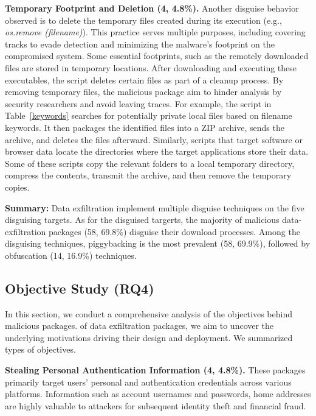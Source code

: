 \textbf{Temporary Footprint and Deletion (4, 4.8\%).} Another disguise behavior observed is to delete the temporary files created during its execution (e.g., \textit{os.remove (filename)}). This practice serves multiple purposes, including covering tracks to evade detection and minimizing the malware's footprint on the compromised system. Some essential footprints, such as the remotely downloaded files are stored in temporary locations. After downloading and executing these executables, the script deletes certain files as part of a cleanup process. By removing temporary files, the malicious package aim to hinder analysis by security researchers and avoid leaving traces. For example, the script in Table~\ref{keywords} searches for potentially private local files based on filename keywords. It then packages the identified files into a ZIP archive, sends the archive, and deletes the files afterward. Similarly, scripts that target software or browser data locate the directories where the target applications store their data. Some of these scripts copy the relevant folders to a local temporary directory, compress the contents, transmit the archive, and then remove the temporary copies.


\begin{tcolorbox}[size=title, opacityfill=0.15, after=\vspace{-10pt}]
\textbf{Summary:} Data exfiltration  implement multiple disguise techniques on the {five} disguising targets. As for the disguised targerts, the majority of malicious data-exfiltration packages (58, 69.8\%) disguise their download processes. Among the disguising techniques, piggybacking is the most prevalent (58, 69.9\%), followed by obfuscation (14, 16.9\%) techniques.
\end{tcolorbox}

\subsection{Objective Study (RQ4)}

In this section, we conduct a comprehensive analysis of the objectives behind malicious packages.  of data exfiltration packages, we aim to uncover the underlying motivations driving their design and deployment. We summarized  types of objectives.

\textbf{Stealing Personal Authentication Information (4, 4.8\%).} These packages primarily target users' personal and authentication credentials across various platforms.  Information such as account usernames and passwords, home addresses are highly valuable to attackers for subsequent identity theft and financial fraud.

